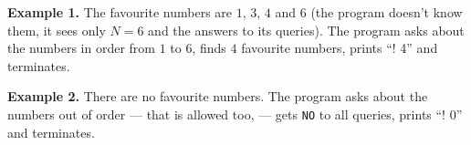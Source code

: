 \textbf{Example 1.} The favourite numbers are $1$, $3$, $4$ and $6$ (the program doesn't know them, it sees only $N = 6$ and the answers to its queries). The program asks about the numbers in order from $1$ to $6$, finds $4$ favourite numbers, prints ``! 4'' and terminates.

\textbf{Example 2.} There are no favourite numbers. The program asks about the numbers out of order --- that is allowed too, --- gets \texttt{NO} to all queries, prints ``! 0'' and terminates.
